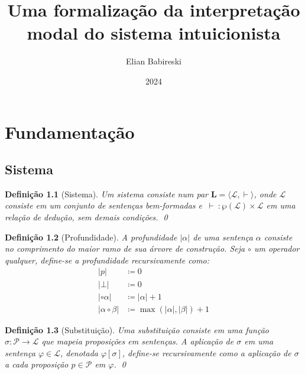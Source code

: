 \documentclass{report}
\newtheorem{definition}{Definição}
\begin{document}
    \title{Uma formalização da interpretação modal do sistema intuicionista}
    \author{Elian Babireski}
    \date{2024}

    \maketitle

    \tableofcontents

    
    

    \chapter{Fundamentação}

    \section{Sistema}

    \begin{definition}[Sistema]
        Um sistema consiste num par $\mathbf{L} = \langle \mathcal{L}, \vdash\rangle$, onde $\mathcal{L}$ consiste em um conjunto de sentenças bem-formadas e $\, \vdash \: : \wp(\mathcal{L}) \times \mathcal{L} $ em uma relação de dedução, sem demais condições.
        \qed
    \end{definition}

    \begin{definition}[Profundidade]
        A profundidade $|\alpha|$ de uma sentença $\alpha$ consiste no comprimento do maior ramo de sua árvore de construção. Seja $\circ$ um operador qualquer, define-se a profundidade recursivamente como:
        \begin{align*}
            |p|                  & \coloneqq 0                           \\
            |\bot|               & \coloneqq 0                           \\
            |\circ \alpha|       & \coloneqq |\alpha| + 1                \\
            |\alpha \circ \beta| & \coloneqq \max(|\alpha|, |\beta|) + 1
            \tag*{\qed} 
        \end{align*}
    \end{definition}

    \begin{definition}[Substituição]
        Uma substituição consiste em uma função $\sigma : \mathcal{P} \to \mathcal{L}$ que mapeia proposições em sentenças. A aplicação de $\sigma$ em uma sentença $\varphi \in \mathcal{L}$, denotada $\varphi[\sigma]$, define-se recursivamente como a aplicação de $\sigma$ a cada proposição $p \in \mathcal{P}$ em $\varphi$.
        \qed
    \end{definition}    
\end{document}
